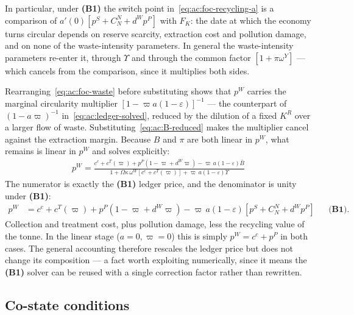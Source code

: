 In particular, under \textbf{(B1)} the switch point in~\eqref{eq:ac:foc-recycling-a} is a comparison of $a'(0)\left[p^S+C^N_N+d^Wp^P\right]$ with $F_K$: the date at which the economy turns circular depends on reserve scarcity, extraction cost and pollution damage, and on none of the waste-intensity parameters. In general the waste-intensity parameters re-enter it, through $\Upsilon$ and through the common factor $\left[1+\pi\omega^Y\right]$ --- which cancels from the comparison, since it multiplies both sides.

 Rearranging~\eqref{eq:ac:foc-waste} before substituting shows that $p^W$ carries the marginal circularity multiplier $\left[1-\varpi a(1-\varepsilon)\right]^{-1}$ --- the counterpart of $\left(1-a\varpi\right)^{-1}$ in~\eqref{eq:ac:ledger-solved}, reduced by the dilution of a fixed $K^R$ over a larger flow of waste. Substituting~\eqref{eq:ac:B-reduced} makes the multiplier cancel against the extraction margin. Because $B$ and $\pi$ are both linear in $p^W$, what remains is linear in $p^W$ and solves explicitly:
\begin{align}
\boxed{\;
p^W = \frac{c^c+c^T(\varpi)+p^P\left(1-\varpi+d^W\varpi\right)-\varpi\,a\left(1-\varepsilon\right)\bar B}
{1+\Omega\kappa\,\omega^W\left[c^c+c^T(\varpi)\right]+\varpi\,a\left(1-\varepsilon\right)\Upsilon}\;}
\label{eq:ac:pW-explicit}
\end{align}
The numerator is exactly the \textbf{(B1)} ledger price, and the denominator is unity under \textbf{(B1)}:
\begin{align}
p^W &= c^c+c^T(\varpi)+p^P\left(1-\varpi+d^W\varpi\right)-\varpi\,a\left(1-\varepsilon\right)\left[p^S+C^N_N+d^Wp^P\right]
&&\textbf{(B1)}.
\label{eq:ac:pW-explicit-B1}
\end{align}
Collection and treatment cost, plus pollution damage, less the recycling value of the tonne. In the linear stage ($a=0,\varpi=0$) this is simply $p^W=c^c+p^P$ in both cases. The general accounting therefore rescales the ledger price but does not change its composition --- a fact worth exploiting numerically, since it means the \textbf{(B1)} solver can be reused with a single correction factor rather than rewritten.

\subsection{Co-state conditions}
\label{subsec:ac:costates}

